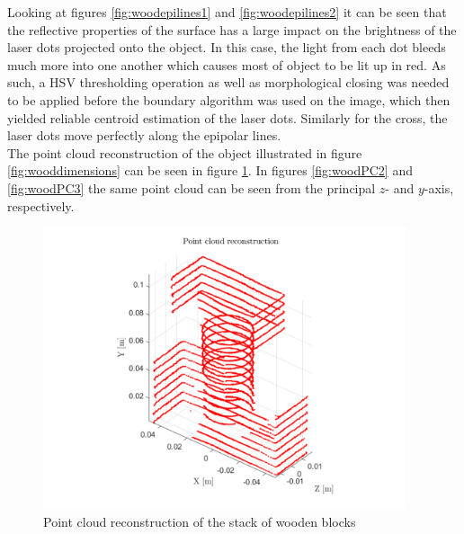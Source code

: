 Looking at figures \ref{fig:woodepilines1} and \ref{fig:woodepilines2} it can be seen that the reflective properties of the surface has a large impact on the brightness of the laser dots projected onto the object. In this case, the light from each dot bleeds much more into one another which causes most of object to be lit up in red. As such, a HSV thresholding operation as well as morphological closing was needed to be applied before the boundary algorithm was used on the image, which then yielded reliable centroid estimation of the laser dots. Similarly for the cross, the laser dots move perfectly along the epipolar lines.\\

The point cloud reconstruction of the object illustrated in figure \ref{fig:wooddimensions} can be seen in figure \ref{fig:woodPC1}. In figures \ref{fig:woodPC2} and \ref{fig:woodPC3} the same point cloud can be seen from the principal $z$- and $y$-axis, respectively.

\begin{figure}[H]
    \centering
    \includegraphics[width=0.95\textwidth]{figures/reconstruction/woodPC1.pdf}
    \caption{Point cloud reconstruction of the stack of wooden blocks}
    \label{fig:woodPC1}
\end{figure}

